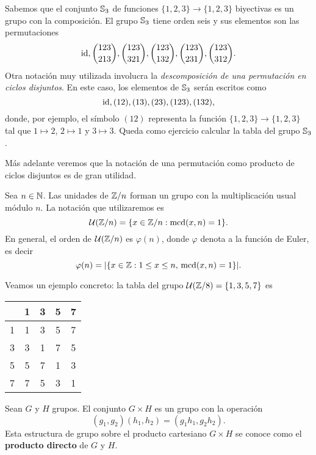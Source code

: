 \begin{example}
	Sabemos que el conjunto $\mathbb{S}_3$ de funciones $\{1,2,3\}\to\{1,2,3\}$
	biyectivas es un grupo con la composición. El grupo $\mathbb{S}_3$ tiene orden
	seis y sus elementos son las permutaciones
	\[
	\operatorname{id},\binom{123}{213},\binom{123}{321},\binom{123}{132},\binom{123}{231},\binom{123}{312}.
	\]
	Otra notación muy utilizada involucra la \emph{descomposición de una permutación en ciclos disjuntos}. 
	En este caso, los elementos de $\mathbb{S}_3$ serán escritos como 
	\[
		\operatorname{id},(12),(13),(23),(123),(132),
	\]
	donde, por ejemplo, el símbolo $(12)$ representa la
	función $\{1,2,3\}\to\{1,2,3\}$ tal que
	$1\mapsto 2$, $2\mapsto 1$ y $3\mapsto 3$. Queda como ejercicio calcular la tabla del grupo $\mathbb{S}_3$. 
\end{example}

Más adelante veremos que la notación de una permutación como producto de ciclos disjuntos es de gran utilidad. 

\begin{example}
Sea $n\in\mathbb{N}$. Las unidades de $\mathbb{Z}/n$ forman un grupo con la multiplicación usual módulo $n$. La notación que utilizaremos es
\[	
\mathcal{U}(\mathbb{Z}/n)=\{x\in\mathbb{Z}/n:\operatorname{mcd}(x,n)=1\}.
\]
En general, el orden de $\mathcal{U}(\mathbb{Z}/n)$ es $\varphi(n)$, donde $\varphi$ denota a la función de Euler, es decir
\[
\varphi(n)=|\{x\in\mathbb{Z}:1\leq x\leq n,\,\operatorname{mcd}(x,n)=1\}|.
\]

Veamos un ejemplo concreto: la tabla del grupo 
$\mathcal{U}(\mathbb{Z}/8)=\{1,3,5,7\}$
es
\begin{center}
  \begin{tabular}{l|cccc}
     &1&3&5&7 \\
    \hline
    1 & 1 & 3 & 5 & 7\\
    3 & 3 & 1 & 7 & 5\\
    5 & 5 & 7 & 1 & 3\\
    7 & 7 & 5 & 3 & 1
  \end{tabular}
\end{center}
\end{example}

\begin{exercise}
	Sean $G$ y $H$ grupos.  
	El conjunto $G\times H$ 
	es un grupo con la operación
	\[
		(g_1,g_2)(h_1,h_2)=(g_1h_1,g_2h_2).
	\]
	Esta estructura de grupo sobre el producto cartesiano $G\times H$ se conoce como
	el \textbf{producto directo} de $G$ y $H$. 
\end{exercise}

